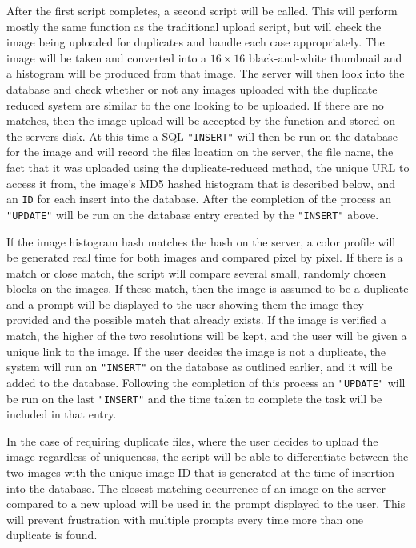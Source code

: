 \documentclass[11pt]{article}
\begin{document}
After the first script completes, a second script will be called. This will perform mostly the same function as the traditional upload script, but will check the image being uploaded for duplicates and handle each case appropriately. The image will be taken and converted into a $16\times 16$ black-and-white thumbnail and a histogram will be produced from that image. The server will then look into the database and check whether or not any images uploaded with the duplicate reduced system are similar to the one looking to be uploaded. If there are no matches, then the image upload will be accepted by the function and stored on the servers disk. At this time a SQL {\tt "INSERT"} will then be run on the database for the image and will record the files location on the server, the file name, the fact that it was uploaded using the duplicate-reduced method, the unique URL to access it from, the image's MD5 hashed histogram that is described below, and an {\tt ID} for each insert into the database. After the completion of the process an {\tt "UPDATE"} will be run on the database entry created by the {\tt "INSERT"} above.

If the image histogram hash matches the hash on the server, a color profile will be generated real time for both images and compared pixel by pixel. If there is a match or close match, the script will compare several small, randomly chosen blocks on the images. If these match, then the image is assumed to be a duplicate and a prompt will be displayed to the user showing them the image they provided and the possible match that already exists. If the image is verified a match, the higher of the two resolutions will be kept, and the user will be given a unique link to the image. If the user decides the image is not a duplicate, the system will run an {\tt "INSERT"} on the database as outlined earlier, and it will be added to the database. Following the completion of this process an {\tt "UPDATE"} will be run on the last {\tt "INSERT"} and the time taken to complete the task will be included in that entry.

In the case of requiring duplicate files, where the user decides to upload the image regardless of uniqueness, the script will be able to differentiate between the two images with the unique image ID that is generated at the time of insertion into the database. The closest matching occurrence of an image on the server compared to a new upload will be used in the prompt displayed to the user. This will prevent frustration with multiple prompts every time more than one duplicate is found.
\end{document}
